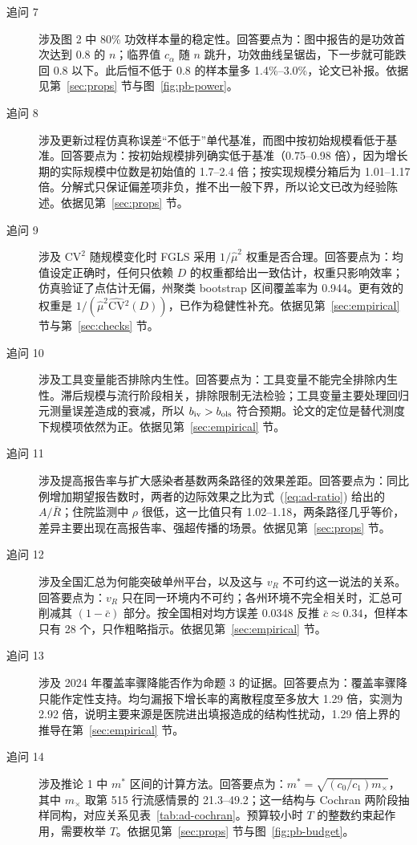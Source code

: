 \begin{description}
\item[追问 7] 涉及图 2 中 80\% 功效样本量的稳定性。回答要点为：图中报告的是功效首次达到 0.8 的 $n$；临界值 $c_\alpha$ 随 $n$ 跳升，功效曲线呈锯齿，下一步就可能跌回 0.8 以下。此后恒不低于 0.8 的样本量多 1.4\%--3.0\%，论文已补报。依据见第~\ref{sec:props} 节与图~\ref{fig:pb-power}。

\item[追问 8] 涉及更新过程仿真称误差“不低于”单代基准，而图中按初始规模看低于基准。回答要点为：按初始规模排列确实低于基准（0.75--0.98 倍），因为增长期的实际规模中位数是初始值的 1.7--2.4 倍；按实现规模分箱后为 1.01--1.17 倍。分解式只保证偏差项非负，推不出一般下界，所以论文已改为经验陈述。依据见第~\ref{sec:props} 节。

\item[追问 9] 涉及 $\mathrm{CV}^2$ 随规模变化时 FGLS 采用 $1/\hat\mu^2$ 权重是否合理。回答要点为：均值设定正确时，任何只依赖 $D$ 的权重都给出一致估计，权重只影响效率；仿真验证了点估计无偏，州聚类 bootstrap 区间覆盖率为 0.944。更有效的权重是 $1/(\hat\mu^2\widehat{\mathrm{CV}}{}^2(D))$，已作为稳健性补充。依据见第~\ref{sec:empirical} 节与第~\ref{sec:checks} 节。

\item[追问 10] 涉及工具变量能否排除内生性。回答要点为：工具变量不能完全排除内生性。滞后规模与流行阶段相关，排除限制无法检验；工具变量主要处理回归元测量误差造成的衰减，所以 $b_{\rm iv}>b_{\rm ols}$ 符合预期。论文的定位是替代测度下规模项依然为正。依据见第~\ref{sec:empirical} 节。

\item[追问 11] 涉及提高报告率与扩大感染者基数两条路径的效果差距。回答要点为：同比例增加期望报告数时，两者的边际效果之比为式~(\ref{eq:ad-ratio}) 给出的 $A/\bar R$；住院监测中 $\rho$ 很低，这一比值只有 1.02--1.18，两条路径几乎等价，差异主要出现在高报告率、强超传播的场景。依据见第~\ref{sec:props} 节。

\item[追问 12] 涉及全国汇总为何能突破单州平台，以及这与 $v_R$ 不可约这一说法的关系。回答要点为：$v_R$ 只在同一环境内不可约；各州环境不完全相关时，汇总可削减其 $(1-\bar c)$ 部分。按全国相对均方误差 0.0348 反推 $\bar c\approx0.34$，但样本只有 28 个，只作粗略指示。依据见第~\ref{sec:empirical} 节。

\item[追问 13] 涉及 2024 年覆盖率骤降能否作为命题 3 的证据。回答要点为：覆盖率骤降只能作定性支持。均匀漏报下增长率的离散程度至多放大 1.29 倍，实测为 2.92 倍，说明主要来源是医院进出填报造成的结构性扰动，1.29 倍上界的推导在第~\ref{sec:empirical} 节。

\item[追问 14] 涉及推论 1 中 $m^*$ 区间的计算方法。回答要点为：$m^*=\sqrt{(c_0/c_1)m_\times}$，其中 $m_\times$ 取第 515 行流感情景的 21.3--49.2；这一结构与 Cochran 两阶段抽样同构，对应关系见表~\ref{tab:ad-cochran}。预算较小时 $T$ 的整数约束起作用，需要枚举 $T$。依据见第~\ref{sec:props} 节与图~\ref{fig:pb-budget}。
\end{description}

